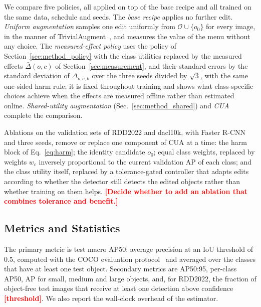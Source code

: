 \documentclass[conference]{IEEEtran}
\newcommand{\todo}[1]{\textcolor{red}{\textbf{[#1]}}}
\begin{document}
We compare five policies, all applied on top of the base recipe and all trained on the same data, schedule and seeds. The \emph{base recipe} applies no further edit. \emph{Uniform augmentation} samples one edit uniformly from $\mathcal{O}\cup\{o_0\}$ for every image, in the manner of TrivialAugment~\cite{muller2021trivial}, and measures the value of the menu without any choice. The \emph{measured-effect policy} uses the policy of Section~\ref{sec:method_policy} with the class utilities replaced by the measured effects $\bar\Delta(o,c)$ of Section~\ref{sec:measurement}, and their standard errors by the standard deviation of $\Delta_{o,c,k}$ over the three seeds divided by $\sqrt{3}$, with the same one-sided harm rule; it is fixed throughout training and shows what class-specific choices achieve when the effects are measured offline rather than estimated online. \emph{Shared-utility augmentation} (Sec.~\ref{sec:method_shared}) and \emph{CUA} complete the comparison.

Ablations on the validation sets of RDD2022 and dacl10k, with Faster R-CNN and three seeds, remove or replace one component of CUA at a time: the harm block of Eq.~\eqref{eq:harm}; the identity candidate $o_0$; equal class weights, replaced by weights $w_c$ inversely proportional to the current validation AP of each class; and the class utility itself, replaced by a tolerance-gated controller that adapts edits according to whether the detector still detects the edited objects rather than whether training on them helps. \todo{Decide whether to add an ablation that combines tolerance and benefit.}

\subsection{Metrics and Statistics}
\label{sec:setup_metrics}

The primary metric is test macro AP50: average precision at an IoU threshold of 0.5, computed with the COCO evaluation protocol~\cite{lin2014coco} and averaged over the classes that have at least one test object. Secondary metrics are AP50:95, per-class AP50, AP for small, medium and large objects, and, for RDD2022, the fraction of object-free test images that receive at least one detection above confidence \todo{threshold}. We also report the wall-clock overhead of the estimator.
\end{document}
